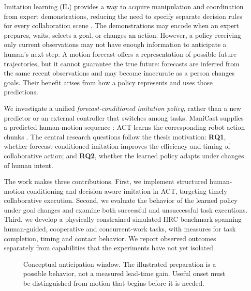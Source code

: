 \documentclass[conference]{IEEEtran}
\begin{document}
Imitation learning (IL) provides a way to acquire manipulation and coordination from expert demonstrations, reducing the need to specify separate decision rules for every collaboration scene \cite{argall2009,zhao2023}. The demonstrations may encode when an expert prepares, waits, selects a goal, or changes an action. However, a policy receiving only current observations may not have enough information to anticipate a human's next step. A motion forecast offers a representation of possible future trajectories, but it cannot guarantee the true future: forecasts are inferred from the same recent observations and may become inaccurate as a person changes goals. Their benefit arises from how a policy represents and uses those predictions.

We investigate a unified \emph{forecast-conditioned imitation policy}, rather than a new predictor or an external controller that switches among tasks. ManiCast supplies a predicted human-motion sequence \cite{kedia2023}; ACT learns the corresponding robot action chunks \cite{zhao2023}. The central research questions follow the thesis motivation: \textbf{RQ1}, whether forecast-conditioned imitation improves the efficiency and timing of collaborative action; and \textbf{RQ2}, whether the learned policy adapts under changes of human intent.

The work makes three contributions. First, we implement structured human-motion conditioning and decision-aware imitation in ACT, targeting timely collaborative execution. Second, we evaluate the behavior of the learned policy under goal changes and examine both successful and unsuccessful task executions. Third, we develop a physically constrained simulated HRC benchmark spanning human-guided, cooperative and concurrent-work tasks, with measures for task completion, timing and contact behavior. We report observed outcomes separately from capabilities that the experiments have not yet isolated.

\begin{figure}[t]
\centering
{}
\caption{Conceptual anticipation window. The illustrated preparation is a possible behavior, not a measured lead-time gain. Useful onset must be distinguished from motion that begins before it is needed.}
\label{fig:motivation}
\end{figure}
\end{document}
